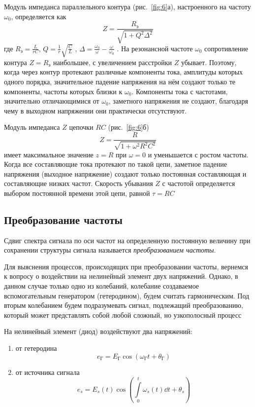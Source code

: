 Модуль импеданса параллельного контура (рис.~\ref{fig:6}а), настроенного на частоту $\omega_0$, определяется как
$$ Z=\frac{R_{\text{э}}}{\sqrt{1+Q^2\Delta^2}} $$
где $ R_{\text{э}} = \frac{L}{rC} $, $ Q = \frac{1}{r}\sqrt{\frac{C}{L}} $ , $ \Delta = \frac{\omega_0}{\omega}-\frac{\omega}{\omega_0} $ . На резонансной частоте $\omega_0$ сопротивление контура $Z = R_{\text{э}}$ наибольшее, с увеличением расстройки $Z$ убывает. Поэтому, когда через контур протекают различные компоненты тока, амплитуды которых одного порядка, значительное падение напряжения на нём создают только те компоненты, частоты которых близки к $\omega_0$. Компоненты тока с частотами, значительно отличающимися от
$\omega_0$, заметного напряжения не создают, благодаря чему в выходном напряжении они практически отсутствуют.

Модуль импеданса $Z$ цепочки $RC$ (рис.~\ref{fig:6}б)
$$ Z=\frac{R}{\sqrt{1+\omega^2R^2C^2}} $$
имеет максимальное значение $z = R$ при $\omega = 0$ и уменьшается с ростом частоты. Когда все составляющие тока протекают по такой цепи, заметное падение напряжения (выходное напряжение) создают только постоянная составляющая и составляющие низких частот. Скорость убывания $Z$ с частотой определяется выбором постоянной времени этой цепи, равной $\tau = RC$
\subsection{Преобразование частоты}
Сдвиг спектра сигнала по оси частот на определенную постоянную величину при сохранении структуры сигнала называется \textit{преобразованием частоты}.

Для выяснения процессов, происходящих при преобразовании частоты, вернемся к вопросу о воздействии на нелинейный элемент двух напряжений. Однако, в данном случае только одно из колебаний, колебание создаваемое вспомогательным генератором (гетеродином), будем считать гармоническим. Под вторым колебанием
будем подразумевать сигнал, подлежащий преобразованию, который может представлять собой любой сложный, но узкополосный процесс

На нелинейный элемент (диод) воздействуют два напряжений: 
\begin{enumerate}
	\item от гетеродина 
	$$e_{\text{Г}}=E_{\text{Г}}\cos(\omega_{\text{Г}}t+\theta_{\text{Г}})$$
	\item от источника сигнала
	$$e_s=E_s(t)\cos(\int\limits_0^t\omega_s(t) \dd t +\theta_s)$$
\end{enumerate}

